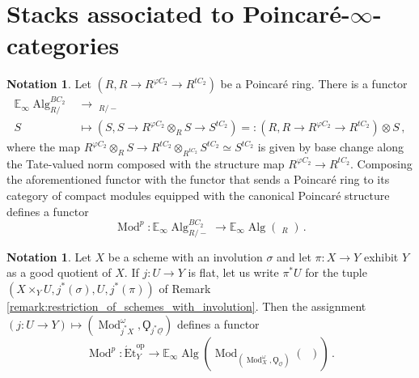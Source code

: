 \documentclass{article}
\DeclareMathOperator{\Alg}{Alg} %
\DeclareMathOperator{\CAlgp}{CAlg^p} %
\DeclareMathOperator{\Catpidem}{Cat^p_{\infty, idem}} %
\DeclareMathOperator{\Mod}{Mod} %
\newcommand{\EE}{\mathbb{E}}
\newcommand{\op}{\mathrm{op}} %
\theoremstyle{definition}
\newtheorem{notation}[equation]{Notation}
\begin{document}
\section{Stacks associated to Poincaré-\texorpdfstring{$ \infty $}{∞}-categories}
\begin{notation}\label{notation:poincare_ring_basechange}
    Let $ (R, R\to R^{\varphi C_2} \to R^{tC_2}) $ be a Poincaré ring. 
    There is a functor 
    \begin{equation*}
    \begin{split}
        \EE_\infty\Alg^{BC_2}_{R/} &\to \CAlgp_{R/-} \\
        S & \mapsto (S, S \to R^{\varphi C_2} \otimes_{R} S \to S^{t C_2}) =: (R, R \to R^{\varphi C_2} \to R^{tC_2}) \otimes S \,,
    \end{split}    
    \end{equation*}
    where the map $ R^{\varphi C_2} \otimes_R S \to R^{tC_2} \otimes_{R^{tC_2}} S^{tC_2} \simeq S^{tC_2} $ is given by base change along the Tate-valued norm composed with the structure map $ R^{\varphi C_2} \to R^{tC_2} $. 
    Composing the aforementioned functor with the functor that sends a Poincaré ring to its category of compact modules equipped with the canonical Poincaré structure defines a functor
    \begin{equation*}
        \Mod^p \colon \EE_\infty\Alg^{BC_2}_{R/-} \to \EE_\infty\Alg\left(\Catpidem_{R}\right) \,.
    \end{equation*}
\end{notation}
\begin{notation}\label{notation:scheme_involution_basechange}
    Let $ X $ be a scheme with an involution $ \sigma $ and let $ \pi \colon X \to Y $ exhibit $ Y $ as a good quotient of $ X $. 
    If $ j \colon U \to Y $ is flat, let us write $ \pi^*U $ for the tuple $ (X \times_Y U, j^*(\sigma), U, j^*(\pi)) $ of Remark \ref{remark:restriction_of_schemes_with_involution}. 
    Then the assignment $ (j \colon U \to Y ) \mapsto \left(\Mod^\omega_{j^*X}, \Qoppa_{j^*\underline{\mathcal{O}}}\right) $ defines a functor %
    \begin{equation*}
        \Mod^p \colon \mathrm{\acute{E}t}_Y^\op \to \EE_\infty \Alg\left(\Mod_{\left(\Mod^\omega_X, \Qoppa_{\underline{\mathcal{O}}}\right)}(\Catpidem)\right) \,.
    \end{equation*}
\end{notation}
\end{document}
